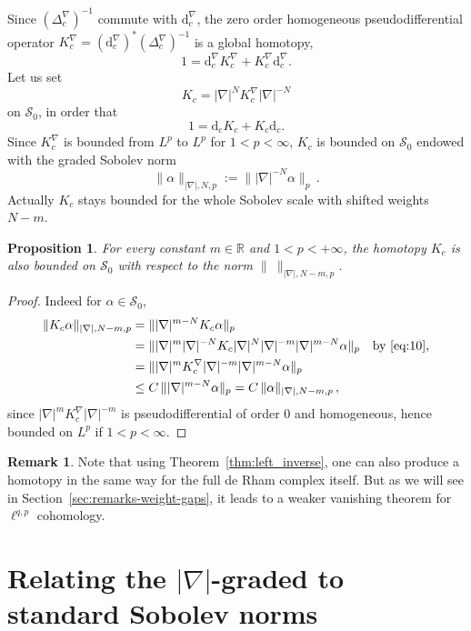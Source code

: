 \documentclass[11pt]{article}
\newtheorem{prop}[theo]{Proposition}
\theoremstyle{definition}
\newtheorem{rema}[theo]{Remark}
\numberwithin{equation}{section}
\numberwithin{figure}{section}
\numberwithin{table}{section}
\newcommand{\R}{\mathbb{R}}
\newcommand*\calS{\mathcal{S}}
\newcommand{\dd}{\mathrm{d}}
\begin{document}
Since $(\Delta_c^{\nabla})^{-1}$ commute with $\dd_c^{\nabla}$, the zero order homogeneous pseudodifferential operator $K_c^\nabla = (\dd_c^{\nabla})^* (\Delta_c^{\nabla})^{-1} $ is a global homotopy,
\[
1 = \dd_c^\nabla K_c^\nabla + K_c^\nabla \dd_c^\nabla.
\]
Let us set
\[
K_c = |\nabla|^{N}K_c^\nabla|\nabla|^{-N}
\]
on $\calS_0$, in order that
\[
1 = \dd_c K_c + K_c \dd_c.
\]
Since $K_c^\nabla$ is bounded from $L^p$ to $L^p$ for $1<p< \infty$, $K_c$ is bounded on $\mathcal{S}_0$ endowed with the graded Sobolev norm
\[
\|\alpha\|_{|\nabla|,N,p}:=\||\nabla|^{-N}\alpha\|_p \,.
\]
Actually $K_c$ stays bounded for the whole Sobolev scale with shifted weights $N - m$.

\begin{prop}\label{prop:K_c_scale}
For every constant $m\in\R$ and $1< p< +\infty$, the homotopy $K_c$ is also bounded on $\calS_0$ with respect to the norm $\| \ \|_{|\nabla|,N-m,p}$.
\end{prop}

\begin{proof}
Indeed for $\alpha\in \mathcal{S}_0$,
\begin{align*}
\|K_c \alpha\|_{|\nabla|,N-m,p} &= \||\nabla|^{m-N}K_c\alpha\|_{p}\\
&= \||\nabla|^m | \nabla|^{-N}K_c| \nabla|^{N} |\nabla|^{-m} |\nabla|^{m-N}\alpha\|_{p} \quad \text{by}~\eqref{eq:10},\\
&=\||\nabla|^m K_c^\nabla|\nabla|^{- m}|
\nabla|^{m-N}\alpha\|_{p} \\
&\leq C\, \|| \nabla|^{m-N}\alpha\|_{p} =C\, \|\alpha\|_{|\nabla|,N-m,p} \,,
\end{align*}
since $|\nabla|^m K_c^\nabla|\nabla|^{- m}$ is pseudodifferential of order $0$ and homogeneous, hence bounded on $L^p$ if $1< p< \infty$.
\end{proof}

\begin{rema}\label{rem:1}
Note that using Theorem~\ref{thm:left_inverse}, one can also produce a homotopy in the same way for the full de Rham complex itself. But as we will see in Section~\ref{sec:remarks-weight-gaps}, it leads to a weaker vanishing theorem for $\ell^{q,p}$ cohomology.
\end{rema}


\section{Relating the \texorpdfstring{$|\nabla|$-}{|nabla|-}graded to standard Sobolev norms}
\end{document}
